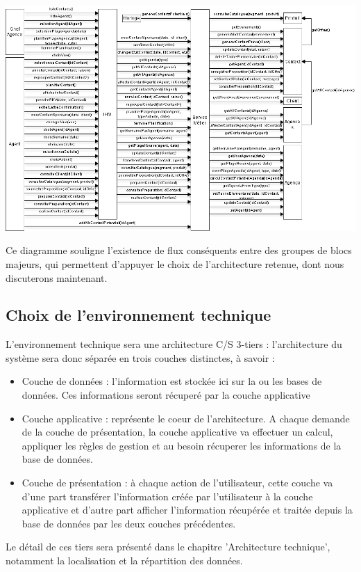 \begin {center}
\includegraphics[width=\textwidth]{diagramme-collaboration.png}
\end {center}

Ce diagramme souligne l'existence de flux conséquents entre des groupes de blocs
majeurs, qui permettent d'appuyer le choix de l'architecture retenue, dont nous
discuterons maintenant.


\subsection{Choix de l'environnement technique}
L'environnement technique sera une architecture C/S 3-tiers : l'architecture du système sera donc séparée en trois couches distinctes, à savoir :
\begin{itemize}
\item Couche de données : l'information est stockée ici sur la ou les bases de données. Ces informations seront récuperé par la couche applicative
\item Couche applicative : représente le coeur de l'architecture. A chaque demande de la couche de présentation, la couche applicative va effectuer un calcul, appliquer les règles de gestion et au besoin récuperer les informations de la base de données.
\item Couche de présentation : à chaque action de l'utilisateur, cette couche va d'une part transférer l'information créée par l'utilisateur à la couche applicative et d'autre part afficher l'information récupérée et traitée depuis la base de données par les deux couches précédentes.
\end{itemize}
Le détail de ces tiers sera présenté dans le chapitre 'Architecture technique', notamment la localisation et la répartition des données.
